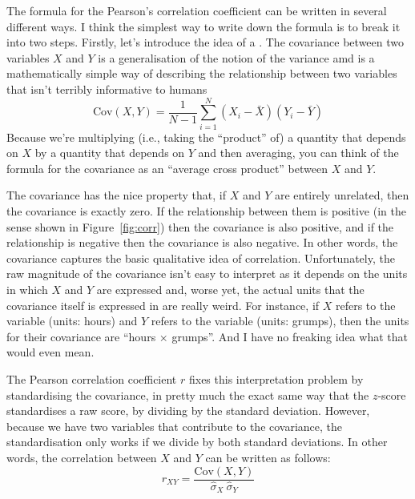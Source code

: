 \vspace{3.5cm}
\begin{mdframed}[style=MyFrame,nobreak=false]
The formula for the Pearson's correlation coefficient can be written in several different ways. I think the simplest way to write down the formula is to break it into two steps. Firstly, let's introduce the idea of a . The covariance between two variables $X$ and $Y$ is a generalisation of the notion of the variance amd is a mathematically simple way of describing the relationship between two variables that isn't terribly informative to humans
$$
\mbox{Cov}(X,Y) = \frac{1}{N-1} \sum_{i=1}^N \left( X_i - \bar{X} \right) \left( Y_i - \bar{Y} \right)
$$
Because we're multiplying (i.e., taking the ``product'' of) a quantity that depends on $X$ by a quantity that depends on $Y$ and then averaging, you can think of the formula for the covariance as an ``average cross product'' between $X$ and $Y$. 

The covariance has the nice property that, if $X$ and $Y$ are entirely unrelated, then the covariance is exactly zero. If the relationship between them is positive (in the sense shown in Figure~\ref{fig:corr}) then the covariance is also positive, and if the relationship is negative then the covariance is also negative. In other words, the covariance captures the basic qualitative idea of correlation. Unfortunately, the raw magnitude of the covariance isn't easy to interpret as it depends on the units in which $X$ and $Y$ are expressed and, worse yet, the actual units that the covariance itself is expressed in are really weird. For instance, if $X$ refers to the  variable (units: hours) and $Y$ refers to the  variable (units: grumps), then the units for their covariance are ``hours $\times$ grumps''. And I have no freaking idea what that would even mean. 

The Pearson correlation coefficient $r$ fixes this interpretation problem by standardising the covariance, in pretty much the exact same way that the $z$-score standardises a raw score, by dividing by the standard deviation. However, because we have two variables that contribute to the covariance, the standardisation only works if we divide by both standard deviations.  In other words, the correlation between $X$ and $Y$ can be written as follows:
$$
r_{XY}  = \frac{\mbox{Cov}(X,Y)}{ \hat{\sigma}_X \ \hat{\sigma}_Y}
$$
\end{mdframed}

